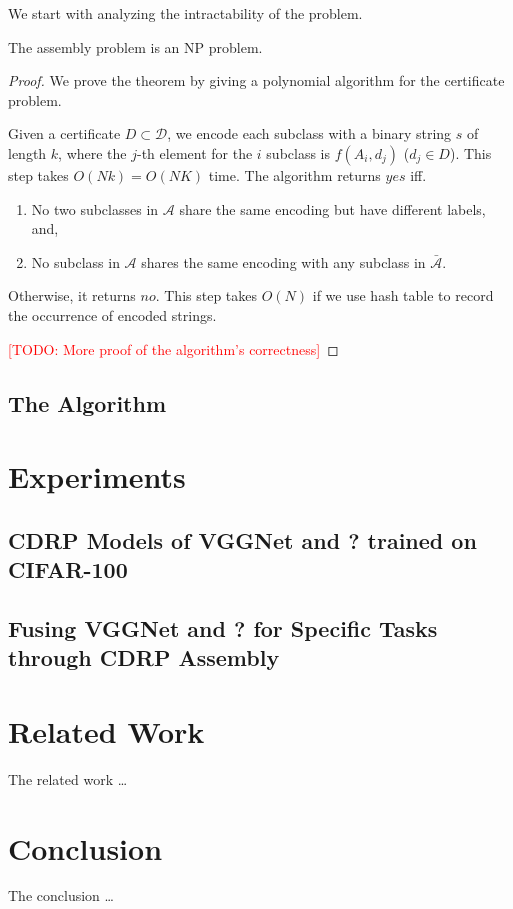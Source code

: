 \documentclass[sigplan,10pt,review]{acmart}\settopmatter{printfolios=true,printccs=false,printacmref=false}
\newcommand{\todo}[1]{\textcolor{red}{[TODO: #1]}}
\begin{document}
We start with analyzing the intractability of the problem.
\begin{theorem}
	The assembly problem is an NP problem.
\end{theorem}
\begin{proof}
We prove the theorem by giving a polynomial algorithm for the certificate problem.

Given a certificate $D \subset \mathcal{D}$, we encode each subclass with a binary string $s$ of length $k$, where the $j$-th element for the $i$ subclass is $f(A_i, d_j)$ ($d_j \in D$).
This step takes $O(Nk) = O(NK)$ time.
The algorithm returns $yes$ iff. \begin{enumerate}
	\item No two subclasses in $\mathcal{A}$ share the same encoding but have different labels, and,
	\item No subclass in $\mathcal{A}$ shares the same encoding with any subclass in $\bar{\mathcal{A}}$.
\end{enumerate}
Otherwise, it returns $no$.
This step takes $O(N)$ if we use hash table to record the occurrence of encoded strings.

\todo{More proof of the algorithm's correctness}
\end{proof}

\subsection{The Algorithm}

\section{Experiments}
\subsection{CDRP Models of VGGNet and ? trained on CIFAR-100}
\subsection{Fusing VGGNet and ? for Specific Tasks through CDRP Assembly}

\section{Related Work}
The related work \dots

\section{Conclusion}
The conclusion \dots


% 
% 




\end{document}
